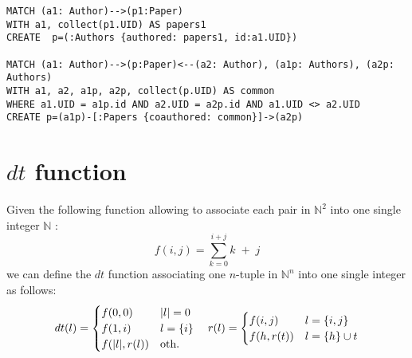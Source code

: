 \begin{lstlisting}[caption={Graph Nesting in Neo4J using Cypher as a Query Language. Please note that, even in this case, is it not possible to return one single nested graph immediately, and hence the nested vertices must be created before creating the nested edges.},language=Cypher,frameround=fttt,frame=trBL,mathescape=true,label=Neo4JQuery]
MATCH (a1: Author)-->(p1:Paper) 
WITH a1, collect(p1.UID) AS papers1 
CREATE  p=(:Authors {authored: papers1, id:a1.UID})

MATCH (a1: Author)-->(p:Paper)<--(a2: Author), (a1p: Authors), (a2p: Authors)
WITH a1, a2, a1p, a2p, collect(p.UID) AS common
WHERE a1.UID = a1p.id AND a2.UID = a2p.id AND a1.UID <> a2.UID
CREATE p=(a1p)-[:Papers {coauthored: common}]->(a2p)
\end{lstlisting}

\section{$dt$ function}
Given the following function allowing to associate each pair in $\mathbb{N}^2$ into one single integer $\mathbb{N}$ \cite{odifreddi1992}:
\[f(i,j)=\sum_{k=0}^{i+j}k\;+\;j\]
we can define the $dt$ function associating one $n$-tuple in $\mathbb{N}^n$ into one single integer as follows:
	\[dt(l)=\begin{cases}
f(0,0) & |l| = 0\\
f(1,i) & l=\{i\}\\
f(|l|,r(l)) & \textup{oth.}\\  
\end{cases}\quad r(l)=\begin{cases}
f(i,j) & l = \{i,j\}\\
f(h,r(t)) & l = \{h\}\cup t\\
\end{cases}\]


%
